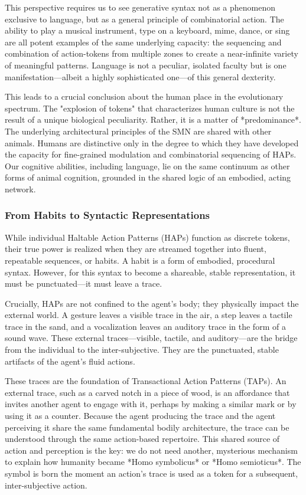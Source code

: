 This perspective requires us to see generative syntax not as a phenomenon exclusive to language, but as a general principle of combinatorial action. The ability to play a musical instrument, type on a keyboard, mime, dance, or sing are all potent examples of the same underlying capacity: the sequencing and combination of action-tokens from multiple zones to create a near-infinite variety of meaningful patterns. Language is not a peculiar, isolated faculty but is one manifestation—albeit a highly sophisticated one—of this general dexterity.

This leads to a crucial conclusion about the human place in the evolutionary spectrum. The "explosion of tokens" that characterizes human culture is not the result of a unique biological peculiarity. Rather, it is a matter of *predominance*. The underlying architectural principles of the SMN are shared with other animals. Humans are distinctive only in the degree to which they have developed the capacity for fine-grained modulation and combinatorial sequencing of HAPs. Our cognitive abilities, including language, lie on the same continuum as other forms of animal cognition, grounded in the shared logic of an embodied, acting network.

\subsubsection*{From Habits to Syntactic Representations}
While individual Haltable Action Patterns (HAPs) function as discrete tokens, their true power is realized when they are streamed together into fluent, repeatable sequences, or habits. A habit is a form of embodied, procedural syntax. However, for this syntax to become a shareable, stable representation, it must be punctuated—it must leave a trace.

Crucially, HAPs are not confined to the agent's body; they physically impact the external world. A gesture leaves a visible trace in the air, a step leaves a tactile trace in the sand, and a vocalization leaves an auditory trace in the form of a sound wave. These external traces—visible, tactile, and auditory—are the bridge from the individual to the inter-subjective. They are the punctuated, stable artifacts of the agent's fluid actions.

These traces are the foundation of Transactional Action Patterns (TAPs). An external trace, such as a carved notch in a piece of wood, is an affordance that invites another agent to engage with it, perhaps by making a similar mark or by using it as a counter. Because the agent producing the trace and the agent perceiving it share the same fundamental bodily architecture, the trace can be understood through the same action-based repertoire. This shared source of action and perception is the key: we do not need another, mysterious mechanism to explain how humanity became *Homo symbolicus* or *Homo semioticus*. The symbol is born the moment an action's trace is used as a token for a subsequent, inter-subjective action.

